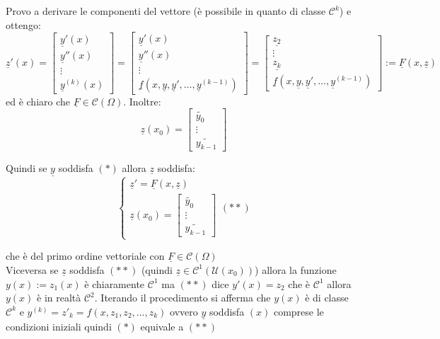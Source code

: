 \documentclass[a4paper,11pt,titlepage]{book}
\begin{document}
Provo a derivare le componenti del vettore (è possibile in quanto di classe $\mathcal{C}^k$) e ottengo: $$\underline{z}'(x)=\begin{bmatrix} \underline{y}'(x)\\
 \underline{y}''(x) \\ 
 \vdots \\ 
 \underline{y}^{(k)}(x) 
 \end{bmatrix} =
\begin{bmatrix} 
\underline{y}'(x)\\ 
\underline{y}''(x) \\ 
\vdots \\ 
\underline{f}(x,\underline{y},\underline{y}',\ldots,\underline{y}^{(k-1)}) \end{bmatrix}=  \begin{bmatrix}
\underline{z_2} \\ 
\vdots \\ 
 \underline{z_k} \\ 
 \underline{f}(x,\underline{y},\underline{y}',\ldots,\underline{y}^{(k-1)}) 
 \end{bmatrix} :=\underline{F}(x,\underline{z})$$
 ed è chiaro che $\underline{F}\in\mathcal{C}(\Omega)$. Inoltre: $$\underline{z}(x_0)=\begin{bmatrix}
 \widetilde{y_0}\\
 \vdots \\
 \widetilde{y_{k-1}}
 \end{bmatrix}$$
 
 Quindi se $\underline{y}$ soddisfa $(*)$ allora $\underline{z}$ soddisfa: $$\begin{cases}
 \underline{z}'=\underline{F}(x,\underline{z})\\
 \underline{z}(x_0)=\begin{bmatrix}
 \widetilde{y_0}\\
 \vdots \\
 \widetilde{y_{k-1}}
 \end{bmatrix}
 \end{cases} (**)$$
 
 che è del primo ordine vettoriale con $\underline{F}\in\mathcal{C}(\Omega)$ \\
 
 Viceversa se $\underline{z}$ soddisfa $(**)$ (quindi $\underline{z}\in\mathcal{C}^1(\mathcal{U}(x_0))$) allora la funzione $y(x):=z_1(x)$ è chiaramente $\mathcal{C}^1$ ma $(**)$ dice $y'(x)=z_2$ che è $\mathcal{C}^1$ allora $y(x)$ è in realtà $\mathcal{C}^2$. Iterando il procedimento si afferma che $y(x)$ è di classe $\mathcal{C}^k$ e $y^{(k)}=z'_k=f(x,z_1,z_2,\ldots,z_k)$ ovvero $\underline{y}$ soddisfa $(x)$ comprese le condizioni iniziali quindi $(*)$ equivale a $(**)$\\
 
\end{document}
